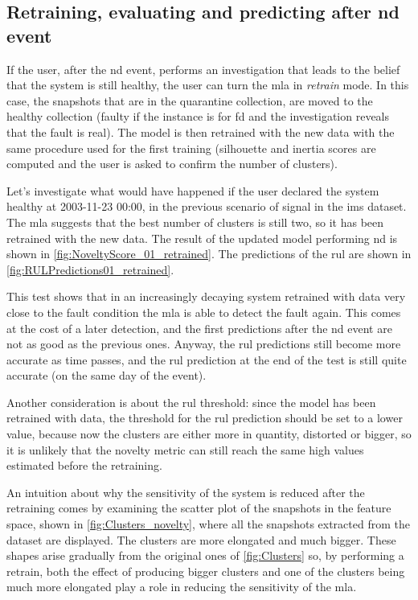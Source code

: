 \subsection{Retraining,  evaluating and predicting after \gls{nd} event}
If the user, after the \gls{nd} event, performs an investigation that leads to the belief that the system is still healthy, the user can turn the \gls{mla} in \emph{retrain} mode. In this case, the snapshots that are in the quarantine collection, are moved to the healthy collection (faulty if the instance is for \gls{fd} and the investigation reveals that the fault is real). 
The model is then retrained with the new data with the same procedure used for the first training (silhouette and inertia scores are computed and the user is asked to confirm the number of clusters).

Let's investigate what would have happened if the user declared the system healthy at 2003-11-23 00:00, in the previous scenario of   signal in the \gls{ims} dataset. The \gls{mla} suggests that the best number of clusters is still two, so it has been retrained with the new data. The result of the updated model performing \gls{nd} is shown in \autoref{fig:NoveltyScore_01_retrained}. The predictions of the \gls{rul} are shown in \autoref{fig:RULPredictions01_retrained}. 

This test shows that in an increasingly decaying system retrained with data very close to the fault condition the \gls{mla} is able to detect the fault again. This comes at the cost of a later detection, and the first predictions after the \gls{nd} event are not as good as the previous ones. Anyway, the \gls{rul} predictions still become more accurate as time passes, and the \gls{rul} prediction at the end of the test is still quite accurate (on the same day of the event). 

Another consideration is about the \gls{rul} threshold: since the model has been retrained with  data, the threshold for the \gls{rul} prediction should be set to a lower value, because now the clusters are either more in quantity, distorted or bigger, so it is unlikely that the novelty metric can still reach the same high values estimated before the retraining.

An intuition about why the sensitivity of the system is reduced after the retraining comes by examining the scatter plot of the snapshots in the feature space, shown in \autoref{fig:Clusters_novelty}, where all the snapshots extracted from the dataset are displayed. The clusters are more elongated and much bigger. These shapes arise gradually from the original ones of \autoref{fig:Clusters} so, by performing a retrain, both the effect of producing bigger clusters and one of the clusters being much more elongated play a role in reducing the sensitivity of the \gls{mla}.

